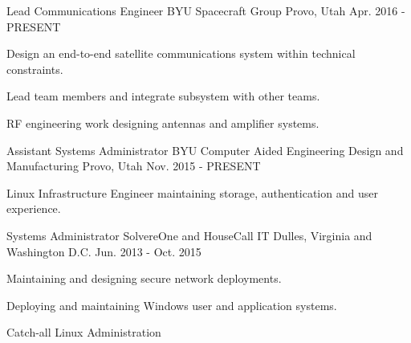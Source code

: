 

\begin{cventries}

  \cventry
  {Lead Communications Engineer} %
  {BYU Spacecraft Group} %
  {Provo, Utah} %
  {Apr. 2016 - PRESENT} %
    {
      \begin{cvitems} %
      \item {Design an end-to-end satellite communications system within technical constraints.}
      \item {Lead team members and integrate subsystem with other teams.}
      \item {RF engineering work designing antennas and amplifier systems.}
      \end{cvitems}
    }

  \cventry
  {Assistant Systems Administrator} %
  {BYU Computer Aided Engineering Design and Manufacturing} %
    {Provo, Utah} %
    {Nov. 2015 - PRESENT} %
    {
      \begin{cvitems} %
      \item {Linux Infrastructure Engineer maintaining storage, authentication and user experience.}
      \end{cvitems}
    }

  \cventry
  {Systems Administrator} %
  {SolvereOne and HouseCall IT} %
  {Dulles, Virginia and Washington D.C.} %
    {Jun. 2013 - Oct. 2015} %
    {
      \begin{cvitems} %
      \item {Maintaining and designing secure network deployments.}
      \item {Deploying and maintaining Windows user and application systems.}
      \item {Catch-all Linux Administration}
      \end{cvitems}
    }

\end{cventries}

